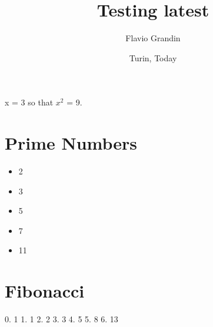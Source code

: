 \documentclass{article}
\title{Testing latest}
\author{Flavio Grandin}
\date{Turin, Today}
\begin{document}
x = 3 so that $x^2$ = 9.
\section{Prime Numbers}
\begin{itemize}
\item 2
\item 3
\item 5
\item 7
\item 11
\end{itemize}
\section{Fibonacci}
0. 1
1. 1
2. 2
3. 3
4. 5
5. 8
6. 13
\end{document}

